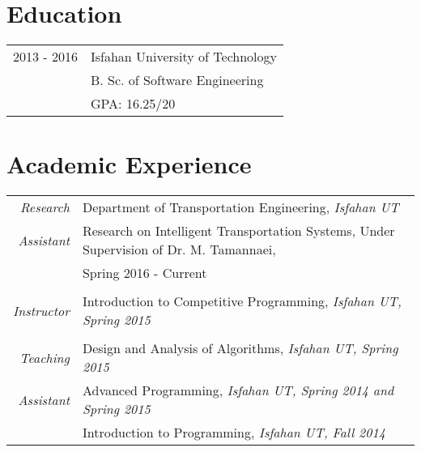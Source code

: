 \documentclass[a4paper,10pt]{article}
\begin{document}
	
	\section{Education}
	\begin{tabular}{rl}	
		{2013 - 2016} & {Isfahan University of Technology}\\
					   & {\small B. Sc. of Software Engineering} \\
				       & {\small GPA: 16.25/20}
	\end{tabular}
	
	\section{Academic Experience}
		\begin{tabular}{r|p{11cm}}
			\emph{Research} & Department of Transportation Engineering, \emph{\color{darkgray}\small Isfahan UT} \\
			\emph{Assistant}&\footnotesize{Research on Intelligent Transportation Systems, Under Supervision of Dr. M. Tamannaei,}\\
			&\footnotesize{Spring 2016 - Current}\\
							
			\multicolumn{2}{c}{} \\
			\emph{Instructor} & Introduction to Competitive Programming, \emph{\color{darkgray}\small Isfahan UT, Spring 2015}\\
			\multicolumn{2}{c}{} \\
			\emph{Teaching} & Design and Analysis of Algorithms, \emph{\color{darkgray}\small Isfahan UT, Spring 2015} \vspace{1 mm}\\
			\emph{Assistant}& Advanced Programming, \emph{\color{darkgray}\small Isfahan UT, Spring 2014 and Spring 2015}\vspace{1 mm}\\
							& Introduction to Programming, \emph{\color{darkgray}\small Isfahan UT, Fall 2014}\\
		\end{tabular}
	
\end{document}
